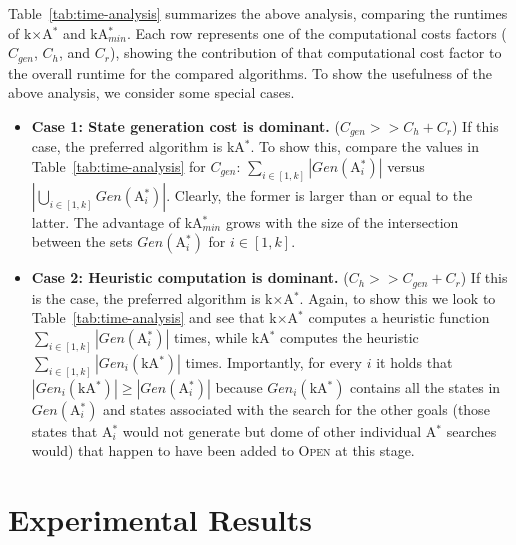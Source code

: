 \documentclass{aicom2e}
\newcommand{\astar}{A$^*$}
\newcommand{\kastar}{kA$^*$}
\newcommand{\kastarmin}{kA$^*_{min}$}
\newcommand{\kxastar}{k$\times$A$^*$}
\newcommand{\astari}[1]{A$^*_#1$}
\newcommand{\open}{\textsc{Open}}
\newcommand{\roni}[1]{\textbf{[RS:#1]}}
\begin{document}
Table~\ref{tab:time-analysis} summarizes the above analysis, comparing the
runtimes of \kxastar{} and \kastarmin{}. Each row represents one of the
computational costs factors ($C_{gen}$, $C_{h}$, and $C_{r}$),
showing the contribution of that computational cost factor to the overall
runtime for the compared algorithms. To show the usefulness of the above
analysis, we consider some special cases.
\begin{itemize}
    \item {\bf Case 1: State generation cost is dominant.} ($C_{gen}>>C_{h}+C_r$)
    If this case, the preferred algorithm is \kastar{}. To show this,
    compare the values in Table~\ref{tab:time-analysis} for $C_{gen}$: $\sum_{i\in[1,k]} |Gen(\text{\astari{i}})|$
    versus $|\bigcup_{i\in[1,k]} Gen(\text{\astari{i}})|$. Clearly, the former is larger than or equal to the latter.
    The advantage of \kastarmin{} grows with the size of the intersection between the sets $Gen(\text{\astari{i}})$ for $i\in[1,k]$.

    \item {\bf Case 2: Heuristic computation is dominant.} ($C_{h}>>C_{gen}+C_r$)
    If this is the case, the preferred algorithm is \kxastar{}. Again, to show this we look to Table~\ref{tab:time-analysis} and see that \kxastar{} computes a heuristic function
    $\sum_{i\in[1,k]} |Gen(\text{\astari{i}})|$ times, while
    \kastar{} computes the heuristic $\sum_{i\in[1,k]} |Gen_i(\text{\kastar})|$ times.
    Importantly, for every $i$ it holds that $|Gen_i(\text{\kastar})|\geq |Gen(\text{\astari{i}})|$
    because $Gen_i(\text{\kastar})$ contains all the states in $Gen(\text{\astari{i}})$
    and states associated with the search for the other goals 
    (those states that \astari{i} would not generate but dome of other individual \astar{} searches would) that happen to have been added to \open{} at this stage.
\end{itemize}


\section{Experimental Results}
\end{document}
